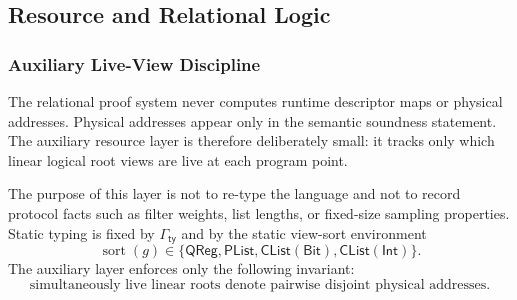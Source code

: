 \documentclass[acmsmall,screen,review,anonymous,nonacm]{acmart}
\theoremstyle{defn_style}
\begin{document}
\subsection{Resource and Relational Logic}

\subsubsection{\textbf{Auxiliary Live-View Discipline}}\label{resource_system}

The relational proof system never computes runtime descriptor maps or physical
addresses. Physical addresses appear only in the semantic soundness statement.
The auxiliary resource layer is therefore deliberately small: it tracks only
which linear logical root views are live at each program point.

The purpose of this layer is not to re-type the language and not to record
protocol facts such as filter weights, list lengths, or fixed-size sampling
properties. Static typing is fixed by \(\Gamma_{\mathsf{ty}}\) and by the
static view-sort environment
\[
\operatorname{sort}(g)\in
\{
\mathsf{QReg},
\mathsf{PList},
\mathsf{CList}(\mathsf{Bit}),
\mathsf{CList}(\mathsf{Int})
\}.
\]
The auxiliary layer enforces only the following invariant:
\[
\boxed{
\text{simultaneously live linear roots denote pairwise disjoint physical
addresses.}
}
\]
\end{document}
